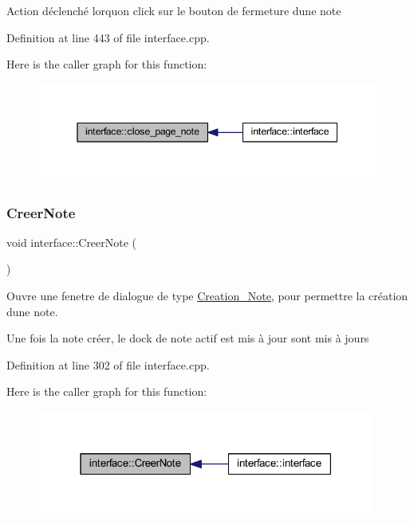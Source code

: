Action déclenché lorqu\textquotesingle{}on click sur le bouton de fermeture d\textquotesingle{}une note 

Definition at line 443 of file interface.\+cpp.

Here is the caller graph for this function\+:\nopagebreak
\begin{figure}[H]
\begin{center}
\leavevmode
\includegraphics[width=345pt]{classinterface_abe2464522932a5d8ed76d1ba02c9d2c6_icgraph}
\end{center}
\end{figure}
\mbox{\label{classinterface_a23957135caad59d8850fe8e2cbee28a3}} 
\subsubsection{\texorpdfstring{Creer\+Note}{CreerNote}}
{\footnotesize\ttfamily void interface\+::\+Creer\+Note (\begin{DoxyParamCaption}{ }\end{DoxyParamCaption})\hspace{0.3cm}{\ttfamily [slot]}}



Ouvre une fenetre de dialogue de type \hyperlink{class_creation___note}{Creation\+\_\+\+Note}, pour permettre la création d\textquotesingle{}une note. 

Une fois la note créer, le dock de note actif est mis à jour sont mis à jours 

Definition at line 302 of file interface.\+cpp.

Here is the caller graph for this function\+:\nopagebreak
\begin{figure}[H]
\begin{center}
\leavevmode
\includegraphics[width=315pt]{classinterface_a23957135caad59d8850fe8e2cbee28a3_icgraph}
\end{center}
\end{figure}
\mbox{\label{classinterface_a319f133949e2be97a203f725c3f1e565}} 
